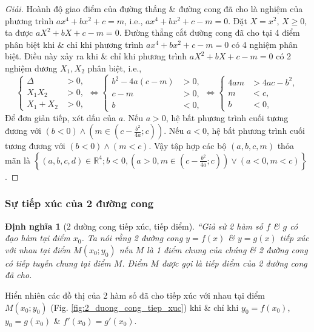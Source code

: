 \documentclass{article}
\numberwithin{equation}{section}
\newtheorem{dinhnghia}{Định nghĩa}[section]
\begin{document}
\begin{proof}[Giải]
	Hoành độ giao điểm của đường thẳng \& đường cong đã cho là nghiệm của phương trình $ax^4 + bx^2 + c = m$, i.e., $ax^4 + bx^2 + c - m = 0$. Đặt $X = x^2$, $X\ge 0$, ta được $aX^2 + bX + c - m = 0$. Đường thẳng cắt đường cong đã cho tại 4 điểm phân biệt khi \& chỉ khi phương trình $ax^4 + bx^2 + c - m = 0$ có 4 nghiệm phân biệt. Điều này xảy ra khi \& chỉ khi phương trình $aX^2 + bX + c - m = 0$  có 2 nghiệm dương $X_1,X_2$ phân biệt, i.e.,
	\begin{equation*}
		\left\{\begin{split}
			\Delta &> 0,\\
			X_1X_2 &> 0,\\
			X_1 + X_2 &> 0,
		\end{split}\right.\Leftrightarrow\left\{\begin{split}
			b^2 - 4a(c - m) &> 0,\\
			c - m &> 0,\\
			b &< 0,
		\end{split}\right.\Leftrightarrow\left\{\begin{split}
		4am &> 4ac - b^2,\\
		m &< c,\\
		b &< 0,
	\end{split}\right.
	\end{equation*}
	Để đơn giản tiếp, xét dấu của $a$. Nếu $a > 0$, hệ bất phương trình cuối tương đương với $(b < 0)\land\left(m\in\left(c - \frac{b^2}{4a};c\right)\right)$. Nếu $a < 0$, hệ bất phương trình cuối tương đương với $(b < 0)\land(m < c)$. Vậy tập hợp các bộ $(a,b,c,m)$ thỏa mãn là $\left\{(a,b,c,d)\in\mathbb{R}^4;b < 0,\left(a > 0,m\in\left(c - \frac{b^2}{4a};c\right)\right)\lor(a < 0,m < c)\right\}$.
\end{proof}

\subsubsection{Sự tiếp xúc của 2 đường cong}

\begin{dinhnghia}[2 đường cong tiếp xúc, tiếp điểm]
	``Giả sử 2 hàm số $f$ \& $g$ có đạo hàm tại điểm $x_0$. Ta nói rằng 2 đường cong $y = f(x)$ \& $y = g(x)$ \emph{tiếp xúc} với nhau tại điểm $M(x_0;y_0)$ nếu $M$ là 1 điểm chung của chúng \& 2 đường cong có tiếp tuyến chung tại điểm $M$. Điểm $M$ được gọi là \emph{tiếp điểm} của 2 đường cong đã cho.
\end{dinhnghia}
Hiển nhiên các đồ thị của 2 hàm số đã cho tiếp xúc với nhau tại điểm $M(x_0;y_0)$ (Fig. \ref{fig:2_duong_cong_tiep_xuc}) khi \& chỉ khi $y_0 = f(x_0)$, $y_0 = g(x_0)$ \& $f'(x_0) = g'(x_0)$.
\end{document}
